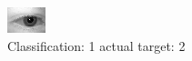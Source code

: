 \begin{figure}[h!]
\begin{center}
\includegraphics[width=0.60\columnwidth]{figures/ID429_class_1_target_2.png}
\end{center}
\caption{ Classification: 1 actual target: 2}
\label{fig:ID429_class_1_target_2}
\end{figure}
